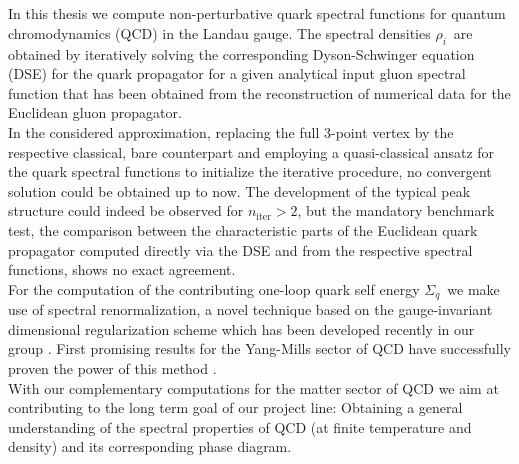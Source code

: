 \thispagestyle{plain}

\makeatletter

\begin{center}
\textbf{\small\@title} \\
\vspace{.1cm}
\@author \\
\end{center}

\makeatother

In this thesis we compute non-perturbative quark spectral functions for quantum chromodynamics (QCD) in the Landau gauge. The spectral densities $\rho_i$\ are obtained by iteratively solving the corresponding Dyson-Schwinger equation (DSE) for the quark propagator for a given analytical input gluon spectral function that has been obtained from the reconstruction of numerical data for the Euclidean gluon propagator. \\ 
In the considered approximation, replacing the full 3-point vertex by the respective classical, bare counterpart and employing a quasi-classical ansatz for the quark spectral functions to initialize the iterative procedure, no convergent solution could be obtained up to now. The development of the typical peak structure could indeed be observed for $n_{\mathrm{iter}}>2$, but the mandatory benchmark test, the comparison between the characteristic parts of the Euclidean quark propagator computed directly via the DSE and from the respective spectral functions, shows no exact agreement.\\
 For the computation of the contributing one-loop quark self energy $\Sigma_q$\ we make use of spectral renormalization, a novel technique based on the gauge-invariant dimensional regularization scheme which has been developed recently in our group  \cite{Horak2019, Wink2020, HorakPawlowskiWink2020}. First promising results for the Yang-Mills sector of QCD have successfully proven the power of this method \cite{HorakPapavassiliouPawlowskiWink2021}. \\ With our complementary computations for the matter sector of QCD we aim at contributing to the long term goal of our project line: Obtaining a general understanding of the spectral properties of QCD (at finite temperature and density) and its corresponding  phase diagram.

\newpage
\thispagestyle{plain}

\makeatletter

